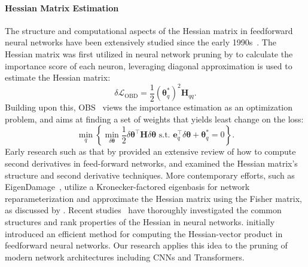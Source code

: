 \paragraph{Hessian Matrix Estimation} The structure and computational aspects of the Hessian matrix in feedforward neural networks have been extensively studied since the early 1990s~\citep{buntine1994computing,wille1997structure}. The Hessian matrix was first utilized in neural network pruning by \citet{obd} to calculate the importance score of each neuron, leveraging diagonal approximation is used to estimate the Hessian matrix:
\begin{equation}
\delta \mathcal{L}_{\mathrm{OBD}}=\frac{1}{2}\left(\boldsymbol{\theta}_q^*\right)^2 \mathbf{H}_{q q}.
\end{equation}
Building upon this, OBS~\citep{obs} views the importance estimation as an optimization problem, and aims at finding a set of weights that yields least change on the loss:
\begin{equation}
    \min _q\left\{\min _{\delta \boldsymbol{\theta}} \frac{1}{2} \delta \boldsymbol{\theta}^{\top} \mathbf{H} \delta \boldsymbol{\theta} \text { s.t. } \mathbf{e}_q^{\top} \delta \boldsymbol{\theta}+\boldsymbol{\theta}_q^*=0\right\}.
    \end{equation}
Early research such as that by \citet{buntine1994computing} provided an extensive review of how to compute second derivatives in feed-forward networks, and \citet{wille1997structure} examined the Hessian matrix's structure and second derivative techniques. More contemporary efforts, such as EigenDamage~\citep{wang2019eigendamage}, utilize a Kronecker-factored eigenbasis for network reparameterization and approximate the Hessian matrix using the Fisher matrix, as discussed by \citet{martens2020new}. Recent studies~\citep{wu2020dissecting,singh2021analytic} have thoroughly investigated the common structures and rank properties of the Hessian in neural networks. \citet{pearlmutter1994fast} initially introduced an efficient method for computing the Hessian-vector product in feedforward neural networks. Our research applies this idea to the pruning of modern network architectures including CNNs and Transformers.

\vspace{-0.1cm}